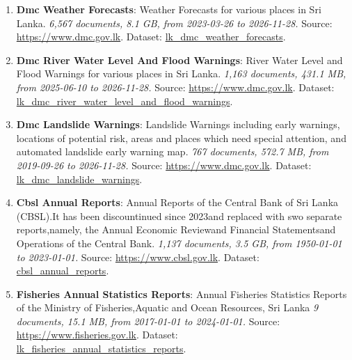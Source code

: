 \documentclass[10pt,a4paper]{article}%
\begin{document}
\begin{enumerate}
\item%
\textbf{Dmc Weather Forecasts}: Weather Forecasts for various places in Sri Lanka.\textit{ 6,567 documents, 8.1 GB, from 2023{-}03{-}26 to 2026{-}11{-}28.} Source: \href{https://www.dmc.gov.lk}{https://www.dmc.gov.lk}. Dataset: \href{https://github.com/nuuuwan/lk\_dmc/tree/data\_lk\_dmc\_weather\_forecasts/data/lk\_dmc\_weather\_forecasts}{lk\_dmc\_weather\_forecasts}.%
\item%
\textbf{Dmc River Water Level And Flood Warnings}: River Water Level and Flood Warnings for various places in Sri Lanka.\textit{ 1,163 documents, 431.1 MB, from 2025{-}06{-}10 to 2026{-}11{-}28.} Source: \href{https://www.dmc.gov.lk}{https://www.dmc.gov.lk}. Dataset: \href{https://github.com/nuuuwan/lk\_dmc/tree/data\_lk\_dmc\_river\_water\_level\_and\_flood\_warnings/data/lk\_dmc\_river\_water\_level\_and\_flood\_warnings}{lk\_dmc\_river\_water\_level\_and\_flood\_warnings}.%
\item%
\textbf{Dmc Landslide Warnings}: Landslide Warnings including early warnings, locations of potential risk, areas and places which need special attention, and automated landslide early warning map.\textit{ 767 documents, 572.7 MB, from 2019{-}09{-}26 to 2026{-}11{-}28.} Source: \href{https://www.dmc.gov.lk}{https://www.dmc.gov.lk}. Dataset: \href{https://github.com/nuuuwan/lk\_dmc/tree/data\_lk\_dmc\_landslide\_warnings/data/lk\_dmc\_landslide\_warnings}{lk\_dmc\_landslide\_warnings}.%
\item%
\textbf{Cbsl Annual Reports}: Annual Reports of the Central Bank of Sri Lanka (CBSL).It has been discountinued since 2023and replaced with swo separate reports,namely, the Annual Economic Reviewand Financial Statementsand Operations of the Central Bank.\textit{ 1,137 documents, 3.5 GB, from 1950{-}01{-}01 to 2023{-}01{-}01.} Source: \href{https://www.cbsl.gov.lk}{https://www.cbsl.gov.lk}. Dataset: \href{https://github.com/nuuuwan/cbsl/tree/data\_cbsl\_annual\_reports/data/cbsl\_annual\_reports}{cbsl\_annual\_reports}.%
\item%
\textbf{Fisheries Annual Statistics Reports}: Annual Fisheries Statistics Reports of the Ministry of Fisheries,Aquatic and Ocean Resources, Sri Lanka\textit{ 9 documents, 15.1 MB, from 2017{-}01{-}01 to 2024{-}01{-}01.} Source: \href{https://www.fisheries.gov.lk}{https://www.fisheries.gov.lk}. Dataset: \href{https://github.com/nuuuwan/lk\_fisheries/tree/data\_lk\_fisheries\_annual\_statistics\_reports/data/lk\_fisheries\_annual\_statistics\_reports}{lk\_fisheries\_annual\_statistics\_reports}.%

\end{enumerate}
\end{document}
